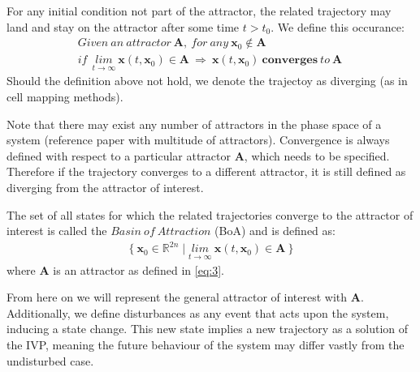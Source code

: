    For any initial condition not part of the attractor, the related trajectory may land and stay on the attractor after some time $t > t_0$. We define this occurance: 
    \begin{gather} Given\ an\ attractor\ \mathbf{A},\ for\ any\ \mathbf{x}_0 \notin \mathbf{A}\\ if\ \ \underset{t \rightarrow \infty}{lim} \ \mathbf{x}(t,\mathbf{x}_0) \in \mathbf{A}\ \Rightarrow\
    \mathbf{x}(t,\mathbf{x}_0)\ \mathbf{converges}\ to\ \mathbf{A}\ \label{eq:5} \end{gather}
    Should the definition above not hold, we denote the trajectoy as diverging (as in cell mapping methods). 

    Note that there may exist any number of attractors in the phase space of a system (reference paper with multitude of attractors). Convergence is always defined with respect to a particular attractor $\mathbf{A}$, which needs to be specified. Therefore if the trajectory converges to a different attractor, it is still defined as diverging from the attractor of interest.  

    The set of all states for which the related trajectories converge to the attractor of interest is called the $Basin\ of\ Attraction$ (BoA) and is defined as: 
    \begin{gather} \{\ \mathbf{x}_0 \in \mathbb{R}^{2n} \mid  \underset{t \rightarrow \infty}{lim} \ \mathbf{x}(t,\mathbf{x}_0) \in \mathbf{A}\ \}\end{gather}
    where $\mathbf{A}$ is an attractor as defined in \ref{eq:3}.

    From here on we will represent the general attractor of interest with $\mathbf{A}$.
    Additionally, we define disturbances as any event that acts upon the system, inducing a state change. This new state implies a new trajectory as a solution of the IVP, meaning the future behaviour of the system may differ vastly from the undisturbed case.





